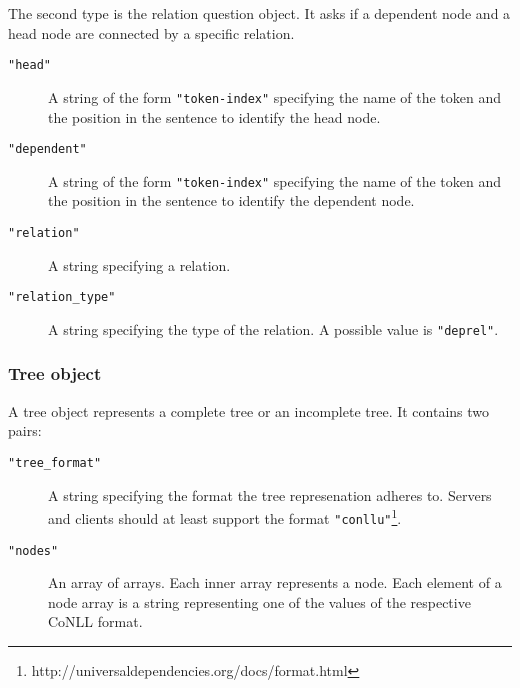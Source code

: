 \documentclass{scrartcl}
\newcommand{\jsstring}[1]{\texttt{\color{OrangeRed}"#1"}}
\begin{document}
The second type is the relation question object.
It asks if a dependent node and a head node are connected by a specific relation.
\begin{description}
    \item[\jsstring{head}] A string of the form \jsstring{token-index} specifying the name of the token and the position in the sentence to identify the head node.
    \item[\jsstring{dependent}] A string of the form \jsstring{token-index} specifying the name of the token and the position in the sentence to identify the dependent node.
    \item[\jsstring{relation}] A string specifying a relation.
    \item[\jsstring{relation\_type}] A string specifying the type of the relation.
        A possible value is \jsstring{deprel}.
\end{description}

\subsubsection{Tree object}
\label{ssub:Tree object}

A tree object represents a complete tree or an incomplete tree.
It contains two pairs:
\begin{description}
    \item[\jsstring{tree\_format}] A string specifying the format the tree represenation adheres to.
        Servers and clients should at least support the format \jsstring{conllu}\footnote{http://universaldependencies.org/docs/format.html}.
    \item[\jsstring{nodes}] An array of arrays.
        Each inner array represents a node.
        Each element of a node array is a string representing one of the values of the respective CoNLL format.
\end{description}
\end{document}
